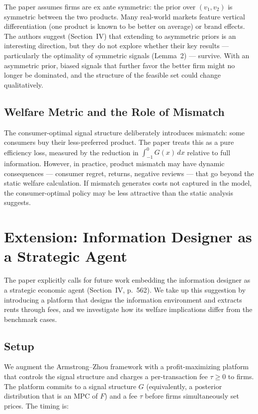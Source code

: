 \documentclass[12pt, a4paper]{article}
\begin{document}
The paper assumes firms are ex ante symmetric: the prior over $(v_1, v_2)$ is symmetric between the two products. Many real-world markets feature vertical differentiation (one product is known to be better on average) or brand effects. The authors suggest (Section~IV) that extending to asymmetric priors is an interesting direction, but they do not explore whether their key results --- particularly the optimality of symmetric signals (Lemma~2) --- survive. With an asymmetric prior, biased signals that further favor the better firm might no longer be dominated, and the structure of the feasible set could change qualitatively.

\subsection{Welfare Metric and the Role of Mismatch}

The consumer-optimal signal structure deliberately introduces mismatch: some consumers buy their less-preferred product. The paper treats this as a pure efficiency loss, measured by the reduction in $\int_{-1}^{0} G(x)\,dx$ relative to full information. However, in practice, product mismatch may have dynamic consequences --- consumer regret, returns, negative reviews --- that go beyond the static welfare calculation. If mismatch generates costs not captured in the model, the consumer-optimal policy may be less attractive than the static analysis suggests.


\section{Extension: Information Designer as a Strategic Agent}

The paper explicitly calls for future work embedding the information designer as a strategic economic agent (Section~IV, p.~562). We take up this suggestion by introducing a platform that designs the information environment and extracts rents through fees, and we investigate how its welfare implications differ from the benchmark cases.

\subsection{Setup}

We augment the Armstrong--Zhou framework with a profit-maximizing platform that controls the signal structure and charges a per-transaction fee $\tau \geq 0$ to firms. The platform commits to a signal structure $G$ (equivalently, a posterior distribution that is an MPC of $F$) and a fee $\tau$ before firms simultaneously set prices. The timing is:
\end{document}
